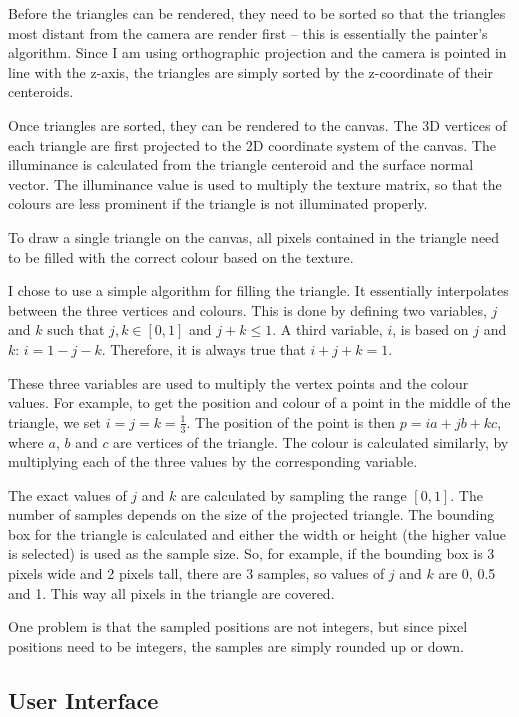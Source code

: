 \documentclass[]{article}
\begin{document}
Before the triangles can be rendered, they need to be sorted so that the triangles most distant from the camera are render first -- this is essentially the painter's algorithm. Since I am using orthographic projection and the camera is pointed in line with the z-axis, the triangles are simply sorted by the z-coordinate of their centeroids.

Once triangles are sorted, they can be rendered to the canvas. The 3D vertices of each triangle are first projected to the 2D coordinate system of the canvas. The illuminance is calculated from the triangle centeroid and the surface normal vector. The illuminance value is used to multiply the texture matrix, so that the colours are less prominent if the triangle is not illuminated properly.

To draw a single triangle on the canvas, all pixels contained in the triangle need to be filled with the correct colour based on the texture.

I chose to use a simple algorithm for filling the triangle. It essentially interpolates between the three vertices and colours. This is done by defining two variables, $j$ and $k$ such that $j, k \in [0, 1]$ and $j + k \leq 1$. A third variable, $i$, is based on $j$ and $k$: $i = 1 - j - k$. Therefore, it is always true that $i + j + k = 1$.

These three variables are used to multiply the vertex points and the colour values. For example, to get the position and colour of a point in the middle of the triangle, we set $i = j = k = \frac{1}{3}$. The position of the point is then $p = i a + j b + k c$, where $a$, $b$ and $c$ are vertices of the triangle. The colour is calculated similarly, by multiplying each of the three values by the corresponding variable.

The exact values of $j$ and $k$ are calculated by sampling the range $[0, 1]$. The number of samples depends on the size of the projected triangle. The bounding box for the triangle is calculated and either the width or height (the higher value is selected) is used as the sample size. So, for example, if the bounding box is 3 pixels wide and 2 pixels tall, there are 3 samples, so values of $j$ and $k$ are 0, 0.5 and 1. This way all pixels in the triangle are covered.

One problem is that the sampled positions are not integers, but since pixel positions need to be integers, the samples are simply rounded up or down.

\subsection{User Interface}
\end{document}
